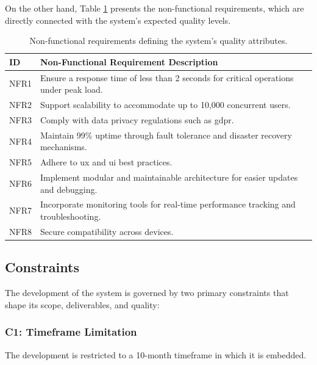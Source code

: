 On the other hand, Table \ref{tab:nonfunctional_requirements} presents the non-functional requirements, which are directly connected with the system's expected quality levels.

\begin{table}[!htb]
\centering
\begin{tabular}{|p{}|p{}|}
\hline
\textbf{ID} & \textbf{Non-Functional Requirement Description} \\ \hline
NFR1 & Ensure a response time of less than 2 seconds for critical operations under peak load. \\ \hline
NFR2 & Support scalability to accommodate up to 10,000 concurrent users. \\ \hline
NFR3 & Comply with data privacy regulations such as \ac{gdpr}. \\ \hline
NFR4 & Maintain 99\% uptime through fault tolerance and disaster recovery mechanisms. \\ \hline
NFR5 & Adhere to \ac{ux} and \ac{ui} best practices. \\ \hline
NFR6 & Implement modular and maintainable architecture for easier updates and debugging. \\ \hline
NFR7 & Incorporate monitoring tools for real-time performance tracking and troubleshooting. \\ \hline
NFR8 & Secure compatibility across devices. \\ \hline
\end{tabular}
\caption[Non-Functional Requirements]{Non-functional requirements defining the system's quality attributes.}
\label{tab:nonfunctional_requirements}
\end{table}



\subsection{Constraints} \label{section:constraints}

The development of the system is governed by two primary constraints that shape its scope, deliverables, and quality:

\subsubsection{C1: Timeframe Limitation}

The development is restricted to a 10-month timeframe in which it is embedded.


